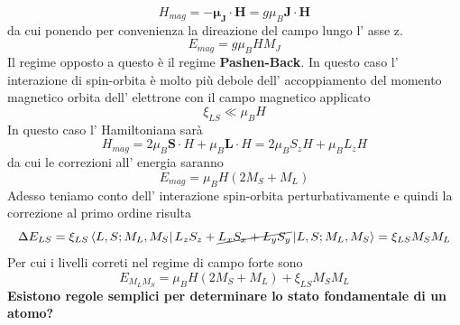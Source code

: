 \begin{equation*}
  H_{mag} = - \bm{\mu_J} \cdot \bm{H} = g \mu_B \bm{J}\cdot \bm{H} 
\end{equation*}
da cui ponendo per convenienza la direazione del campo lungo l' asse z.
\begin{equation*}
  E_{mag} = g \mu_B H M_J
\end{equation*}
Il regime opposto a questo è il regime \textbf{Pashen-Back}. In questo caso l' interazione di spin-orbita è molto più debole dell' accoppiamento del momento magnetico orbita dell' elettrone con il campo magnetico applicato
\begin{equation*}
  \xi_{LS} \ll \mu_B H
\end{equation*}
In questo caso l' Hamiltoniana sarà 
\begin{equation*}
  H_{mag} = 2 \mu_B \bm{S}\cdot H + \mu_B \bm{L}\cdot H = 2 \mu_B S_z H + \mu_B L_z H
\end{equation*}
da cui le correzioni all' energia saranno
\begin{equation*}
  E_{mag} = \mu_B H \left(2 M_S+M_L\right)
\end{equation*}
Adesso teniamo conto dell' interazione spin-orbita perturbativamente e quindi la correzione al primo ordine risulta
\begin{equation*}
  \Delta E_{LS} = \xi_{LS} \bra{L,S;M_L,M_S} L_z S_z +\cancel{L_xS_x+ L_yS_y}\ket{L,S;M_L,M_S} = \xi_{LS}M_SM_L
\end{equation*}
Per cui i livelli correti nel regime di campo forte sono
\begin{equation*}
  E_{M_LM_S} = \mu_B H \left(2 M_S+M_L\right) + \xi_{LS}M_SM_L
\end{equation*}
\textbf{Esistono regole semplici per determinare lo stato fondamentale di un atomo?}
